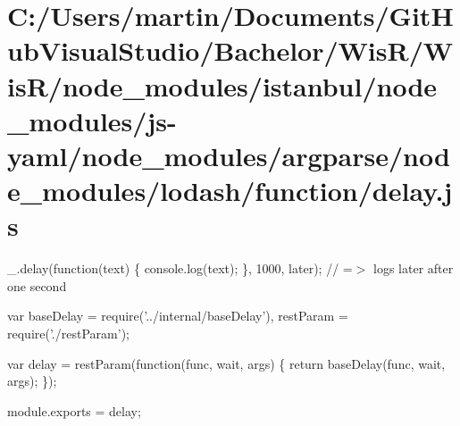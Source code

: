 \hypertarget{_c_1_2_users_2martin_2_documents_2_git_hub_visual_studio_2_bachelor_2_wis_r_2_wis_r_2node_module1d068cc183bd5e56d57bee7459f375ad}{}\section{C\+:/\+Users/martin/\+Documents/\+Git\+Hub\+Visual\+Studio/\+Bachelor/\+Wis\+R/\+Wis\+R/node\+\_\+modules/istanbul/node\+\_\+modules/js-\/yaml/node\+\_\+modules/argparse/node\+\_\+modules/lodash/function/delay.\+js}
\+\_\+.\+delay(function(text) \{ console.\+log(text); \}, 1000, \textquotesingle{}later\textquotesingle{}); // =$>$ logs \textquotesingle{}later\textquotesingle{} after one second


\begin{DoxyCodeInclude}
var baseDelay = require(\textcolor{stringliteral}{'../internal/baseDelay'}),
    restParam = require(\textcolor{stringliteral}{'./restParam'});

var delay = restParam(\textcolor{keyword}{function}(func, wait, args) \{
  \textcolor{keywordflow}{return} baseDelay(func, wait, args);
\});

module.exports = delay;
\end{DoxyCodeInclude}
 